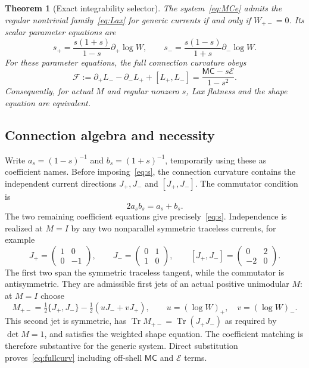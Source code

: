 \documentclass[11pt]{article}
\newtheorem{theorem}{Theorem}[section]
\newcommand{\Tr}{\operatorname{Tr}}
\newcommand{\MC}{\mathsf{MC}}
\newcommand{\cE}{\mathcal E}
\newcommand{\cF}{\mathcal F}
\begin{document}
\begin{theorem}[Exact integrability selector]\label{thm:lax}
The system~\eqref{eq:MCe} admits the regular nontrivial family~\eqref{eq:Lax} for generic currents if and only if $W_{+-}=0$. Its scalar parameter equations are
\begin{equation}\label{eq:s}
 s_+=\frac{s(1+s)}{1-s}\partial_+\log W,\qquad
 s_-=\frac{s(1-s)}{1+s}\partial_-\log W.
\end{equation}
For these parameter equations, the full connection curvature obeys
\begin{equation}\label{eq:fullcurv}
 \boxed{\cF:=\partial_+L_--\partial_-L_++[L_+,L_-]
 =\frac{\MC-s\cE}{1-s^2}.}
\end{equation}
Consequently, for actual $M$ and regular nonzero $s$, Lax flatness and the shape equation are equivalent.
\end{theorem}

\subsection{Connection algebra and necessity}

Write $a_s=(1-s)^{-1}$ and $b_s=(1+s)^{-1}$, temporarily using these as coefficient names. Before imposing~\eqref{eq:s}, the connection curvature contains the independent current directions $J_+,J_-$ and $[J_+,J_-]$. The commutator condition is
\begin{equation}
 2a_sb_s=a_s+b_s.
\end{equation}
The two remaining coefficient equations give precisely~\eqref{eq:s}. Independence is realized at $M=I$ by any two nonparallel symmetric traceless currents, for example
\begin{equation}
 J_+=\begin{pmatrix}1&0\\0&-1\end{pmatrix},\qquad
 J_-=\begin{pmatrix}0&1\\1&0\end{pmatrix},\qquad
 [J_+,J_-]=\begin{pmatrix}0&2\\-2&0\end{pmatrix}.
\end{equation}
The first two span the symmetric traceless tangent, while the commutator is antisymmetric. They are admissible first jets of an actual positive unimodular $M$: at $M=I$ choose
\begin{equation}
 M_{+-}=\tfrac12\{J_+,J_-\}-\tfrac12(uJ_-+vJ_+),\qquad
 u=(\log W)_+,\quad v=(\log W)_-.
\end{equation}
This second jet is symmetric, has $\Tr M_{+-}=\Tr(J_+J_-)$ as required by $\det M=1$, and satisfies the weighted shape equation. The coefficient matching is therefore substantive for the generic system. Direct substitution proves~\eqref{eq:fullcurv} including off-shell $\MC$ and $\cE$ terms.
\end{document}
